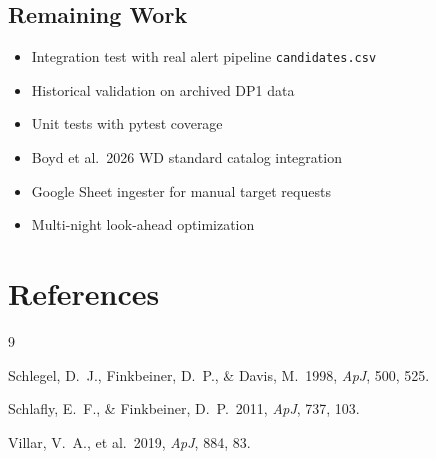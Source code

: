 \documentclass[11pt,letterpaper]{article}
\begin{document}
\subsection{Remaining Work}

\begin{itemize}
\item Integration test with real alert pipeline \texttt{candidates.csv}
\item Historical validation on archived DP1 data
\item Unit tests with pytest coverage
\item Boyd et al.\ 2026 WD standard catalog integration
\item Google Sheet ingester for manual target requests
\item Multi-night look-ahead optimization
\end{itemize}


\section*{References}

\begin{thebibliography}{9}

Schlegel, D.~J., Finkbeiner, D.~P., \& Davis, M.\ 1998,
\textit{ApJ}, 500, 525.

Schlafly, E.~F., \& Finkbeiner, D.~P.\ 2011,
\textit{ApJ}, 737, 103.

Villar, V.~A., et al.\ 2019,
\textit{ApJ}, 884, 83.

\end{thebibliography}
\end{document}
